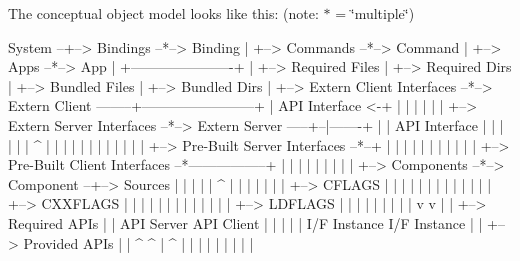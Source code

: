 The conceptual object model looks like this\+: (note\+: \textquotesingle{}$\ast$\textquotesingle{} = \char`\"{}multiple\char`\"{})

\begin{DoxyVerb}System --+--> Bindings --*--> Binding
         |
         +--> Commands --*--> Command
         |
         +--> Apps --*--> App
                           |
    +----------------------+
    |
    +--> Required Files
    |
    +--> Required Dirs
    |
    +--> Bundled Files
    |
    +--> Bundled Dirs
    |
    +--> Extern Client Interfaces --*--> Extern Client --------+------------------------+
    |                                    API Interface <-+     |                        |
    |                                                    |     |                        |
    +--> Extern Server Interfaces --*--> Extern Server -----+--|-------+                |
    |                                    API Interface   |  |  |       |                |
    |                                     ^              |  |  |       |                |
    |                                     |              |  |  |       |                |
    +--> Pre-Built Server Interfaces --*--+              |  |  |       |                |
    |                                                    |  |  |       |                |
    +--> Pre-Built Client Interfaces --*-----------------+  |  |       |                |
    |                                                       |  |       |                |
    +--> Components --*--> Component --+--> Sources         |  |       |                |
    |                          ^       |                    |  |       |                |
    |                          |       +--> CFLAGS          |  |       |                |
    |                          |       |                    |  |       |                |
    |                          |       +--> CXXFLAGS        |  |       |                |
    |                          |       |                    |  |       |                |
    |                          |       +--> LDFLAGS         |  |       |                |
    |                          |       |                    |  |       v                v
    |                          |       +--> Required APIs   |  |   API Server      API Client
    |                          |       |                    |  |   I/F Instance    I/F Instance
    |                          |       +--> Provided APIs   |  |     ^   ^              |  ^
    |                          |       |                    |  |     |   |              |  |

\end{DoxyVerb}

